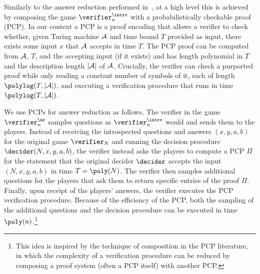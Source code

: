 Similarly to the answer reduction performed in~\cite{NW19}, at a high level this is achieved by composing the game $\verifier^\intro_n$ with a probabilistically checkable proof (PCP). In our context a PCP is a proof encoding that allows a verifier to check whether, given Turing machine $\cal{A}$ and time bound $T$ provided as input, there exists some input $x$ that $\cal{A}$ accepts in time $T$. The PCP proof can be computed from $\cal{A}$, $T$, and the accepting input (if it exists) and has length polynomial in $T$ and the description length $|\cal{A}|$ of $\cal{A}$. Crucially, the verifier can check a purported proof while only reading a constant number of symbols of it, each of length $\polylog(T,|\cal{A}|)$, and executing a verification procedure that runs in time $\polylog(T,|\cal{A}|)$. 

We use PCPs for answer reduction as follows. The verifier in the game $\verifier^\ar_n$ samples questions as $\verifier^\intro_n$ would and sends them to the players. Instead of receiving the introspected questions and answers $(x,y,a,b)$ for the original game $\verifier_N$ and running the decision procedure $\decider(N,x,y,a,b)$, the verifier instead asks the players to compute a PCP $\Pi$ for the statement that the original decider $\decider$ accepts the input $(N,x,y,a,b)$ in time $T=\poly(N)$. The verifier then samples additional questions for the players that ask them to return specific entries of the proof $\Pi$. Finally, upon receipt of the players' answers, the verifier executes the PCP verification procedure. Because of the efficiency of the PCP, both the sampling of the additional questions and the decision procedure can be executed in time $\poly(n)$.\footnote{This idea is inspired by the technique of composition in the PCP literature, in which the complexity of a verification procedure can be reduced by composing a proof system (often a PCP itself) with another PCP.}

